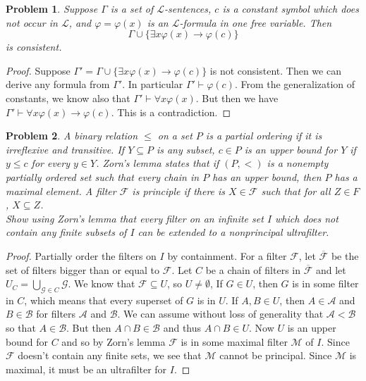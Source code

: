 \documentclass{article}
\newtheorem{problem}{Problem}
\begin{document}
\begin{problem}
Suppose $\Gamma$ is a set of $\mathcal{L}$-sentences, $c$ is a constant symbol which does not occur in $\mathcal{L}$, and $\varphi = \varphi(x)$ is an $\mathcal{L}$-formula in one free variable. Then
\[
\Gamma \cup \{\exists x \varphi(x) \rightarrow \varphi(c)\}
\]
is consistent.
\end{problem}
\begin{proof}
Suppose $\Gamma' = \Gamma \cup \{\exists x \varphi(x) \rightarrow \varphi(c)\}$ is not consistent. Then we can derive any formula from $\Gamma'$. In particular $\Gamma' \vdash \varphi(c)$. From the generalization of constants, we know also that $\Gamma' \vdash \forall x \varphi(x)$. But then we have $\Gamma' \vdash \forall x \varphi(x) \rightarrow \varphi(c)$. This is a contradiction.
\end{proof}

\begin{problem}
A binary relation $\leq$ on a set $P$ is a \emph{partial ordering} if it is irreflexive and transitive. If $Y \subseteq P$ is any subset, $c \in P$ is an \emph{upper bound} for $Y$ if $y \leq c$ for every $y \in Y$. Zorn's lemma states that if $(P, < )$ is a nonempty partially ordered set such that every chain in $P$ has an upper bound, then $P$ has a maximal element. A filter $\mathcal{F}$ is \emph{principle} if there is $X \in \mathcal{F}$ such that for all $Z \in F$, $X \subseteq Z$.\\
Show using Zorn's lemma that every filter on an infinite set $I$ which does not contain any finite subsets of $I$ can be extended to a nonprincipal ultrafilter.
\end{problem}
\begin{proof}
Partially order the filters on $I$ by containment. For a filter $\mathcal{F}$, let $\overline{\mathcal{F}}$ be the set of filters bigger than or equal to $\mathcal{F}$. Let $C$ be a chain of filters in $\overline{\mathcal{F}}$ and let $U_C = \bigcup_{\mathcal{G} \in C} \mathcal{G}$. We know that $\mathcal{F} \subseteq U$, so $U \neq \emptyset$, If $G \in U$, then $G$ is in some filter in $C$, which means that every superset of $G$ is in $U$. If $A, B \in U$, then $A \in \mathcal{A}$ and $B \in \mathcal{B}$ for filters $\mathcal{A}$ and $\mathcal{B}$. We can assume without loss of generality that $\mathcal{A} < \mathcal{B}$ so that $A \in \mathcal{B}$. But then $A \cap B \in \mathcal{B}$ and thus $A \cap B \in U$. Now $U$ is an upper bound for $C$ and so by Zorn's lemma $\mathcal{F}$ is in some maximal filter $\mathcal{M}$ of $I$. Since $\mathcal{F}$ doesn't contain any finite sets, we see that $\mathcal{M}$ cannot be principal. Since $\mathcal{M}$ is maximal, it must be an ultrafilter for $I$.
\end{proof}
\end{document}

